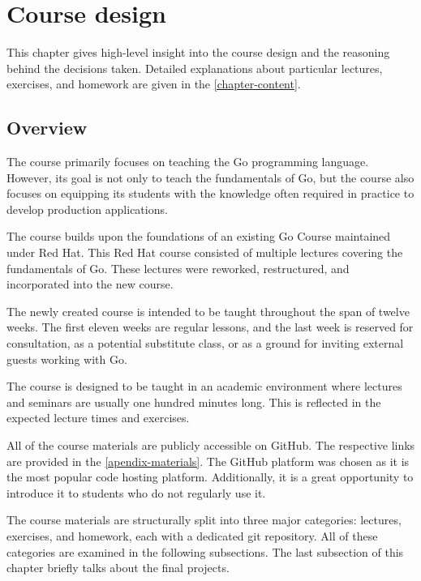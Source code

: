 \documentclass[
  digital,
  color,
  oneside,
  nosansbold,
  nocolorbold,
  nolof,
  nolot,
]{fithesis4}
\begin{document}
\chapter{Course design}\label{chapter-design}

This chapter gives high-level insight into the course design and the reasoning behind the decisions taken. Detailed explanations about particular lectures, exercises, and homework are given in the \cref{chapter-content}.

\section{Overview}\label{design-overview}

The course primarily focuses on teaching the Go programming language. However, its goal is not only to teach the fundamentals of Go, but the course also focuses on equipping its students with the knowledge often required in practice to develop production applications.

The course builds upon the foundations of an existing Go Course maintained under Red Hat\cite{redhat-go-course}. This Red Hat course consisted of multiple lectures covering the fundamentals of Go. These lectures were reworked, restructured, and incorporated into the new course.

The newly created course is intended to be taught throughout the span of twelve weeks. The first eleven weeks are regular lessons, and the last week is reserved for consultation, as a potential substitute class, or as a ground for inviting external guests working with Go.

The course is designed to be taught in an academic environment where lectures and seminars are usually one hundred minutes long. This is reflected in the expected lecture times and exercises.

All of the course materials are publicly accessible on GitHub. The respective links are provided in the \cref{apendix-materials}. The GitHub platform was chosen as it is the most popular code hosting platform\cite{github-wiki}. Additionally, it is a great opportunity to introduce it to students who do not regularly use it.

The course materials are structurally split into three major categories: lectures, exercises, and homework, each with a dedicated git repository. All of these categories are examined in the following subsections. The last subsection of this chapter briefly talks about the final projects.
\end{document}
